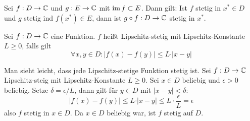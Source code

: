 \begin{satz}
    Sei $f:D\to \mathbb{C}$ und $g:E\to \mathbb{C}$ mit $\operatorname{im} f \subset E$. Dann gilt: Ist $f$ stetig in $x^*\in D$ und $g$ stetig ind $f(x^*)\in E$, dann ist $g\circ f:D\to \mathbb{C}$ stetig in $x^*$.
\end{satz}
\begin{defn}
    Sei $f:D\to \mathbb{C}$ eine Funktion. $f$ heißt Lipschitz-stetig mit Lipschitz-Konstante $L\ge 0$, falls gilt
    \[
    \forall x,y\in D: \vert f(x)-f(y)\vert \le L\cdot \vert x-y\vert    
    \]
\end{defn}
\begin{bem}
    Man sieht leicht, dass jede Lipschitz-stetige Funktion stetig ist. Sei $f:D\to \mathbb{C}$ Lipschitz-steig mit Lipschitz-Konstante $L\ge 0$. Sei $x\in D$ beliebig und $\epsilon>0$ beliebig. Setze $\delta = \epsilon/L$, dann gilt für $y\in D$ mit $\vert x-y\vert<\delta$:
    \[
    \vert f(x)-f(y)\vert \le L \cdot \vert x-y\vert \le  L\cdot \frac{\epsilon}{L}=\epsilon
    \]
    also $f$ stetig in $x\in D$. Da $x\in D$ beliebig war, ist $f$ stetig auf $D$.
\end{bem}
